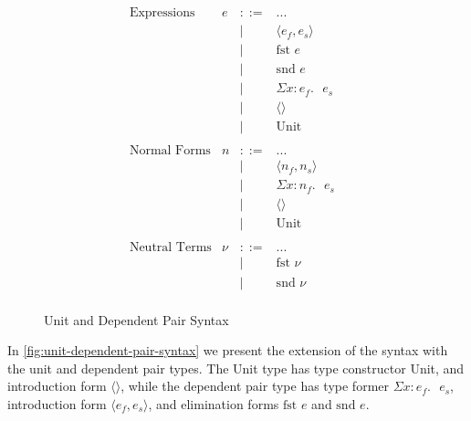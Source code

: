 \documentclass[sigplan]{acmart}
\newcommand{\bnfdef}{::=}
\newcommand{\bnfalt}{\mid}
\newcommand{\pairE}[2]{\langle #1, #2 \rangle}
\newcommand{\fstE}[1]{\text{fst } #1}
\newcommand{\sndE}[1]{\text{snd } #1}
\newcommand{\sigmaE}[3]{\Sigma #1 : #2. \text{ } #3}
\newcommand{\unitE}{\langle \rangle}
\newcommand{\unittE}{\text{Unit}}
\begin{document}
\begin{figure}[!htb]
  \begin{displaymath}
    \begin{array}{lrcll}
      \text{Expressions} & e & \bnfdef & ... & \\
      & & \bnfalt & \pairE{e_f}{e_s} & \\
      & & \bnfalt & \fstE{e} & \\
      & & \bnfalt & \sndE{e} & \\
      & & \bnfalt & \sigmaE{x}{e_f}{e_s} & \\
      & & \bnfalt & \unitE & \\
      & & \bnfalt & \unittE & \\
      \\
      \text{Normal Forms} & n & \bnfdef & ... & \\
      & & \bnfalt & \pairE{n_f}{n_s} & \\
      & & \bnfalt & \sigmaE{x}{n_f}{e_s} & \\
      & & \bnfalt & \unitE & \\
      & & \bnfalt & \unittE & \\
      \\
      \text{Neutral Terms} & \nu & \bnfdef & ... & \\
      & & \bnfalt & \fstE{\nu} & \\
      & & \bnfalt & \sndE{\nu} & \\
    \end{array}
  \end{displaymath}
  \caption{Unit and Dependent Pair Syntax}
  \label{fig:unit-dependent-pair-syntax}
\end{figure}

In \autoref{fig:unit-dependent-pair-syntax} we present the extension of the syntax with the unit and dependent pair types.
The Unit type has type constructor Unit, and introduction form $\unitE$, while the dependent pair type has type former $\sigmaE{x}{e_f}{e_s}$, introduction form $\pairE{e_f}{e_s}$, and elimination forms $\fstE{e}$ and $\sndE{e}$.
\end{document}
